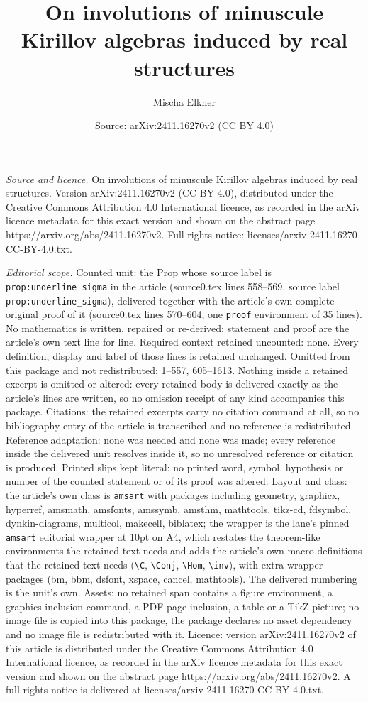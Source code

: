 \documentclass[10pt,a4paper]{amsart}
\title[On involutions of minuscule Kirillov algebras induced by rea]{On involutions of minuscule Kirillov algebras induced by real structures}
\author{Mischa Elkner}
\date{Source: arXiv:2411.16270v2 (CC BY 4.0)}
\begin{document}
\maketitle

\noindent\emph{Source and licence.} On involutions of minuscule Kirillov algebras induced by real structures. Version arXiv:2411.16270v2 (CC BY 4.0), distributed under the Creative Commons Attribution 4.0 International licence, as recorded in the arXiv licence metadata for this exact version and shown on the abstract page https://arxiv.org/abs/2411.16270v2. Full rights notice: licenses/arxiv-2411.16270-CC-BY-4.0.txt.\par\smallskip

\noindent\textit{Editorial scope.} Counted unit: the Prop whose source label is \texttt{prop:underline\_sigma} in the article (source0.tex lines 558--569, source label \texttt{prop:underline\_sigma}), delivered together with the article's own complete original proof of it (source0.tex lines 570--604, one \texttt{proof} environment of 35 lines). No mathematics is written, repaired or re-derived: statement and proof are the article's own text line for line. Required context retained uncounted: none. Every definition, display and label of those lines is retained unchanged. Omitted from this package and not redistributed: 1--557, 605--1613. Nothing inside a retained excerpt is omitted or altered: every retained body is delivered exactly as the article's lines are written, so no omission receipt of any kind accompanies this package. Citations: the retained excerpts carry no citation command at all, so no bibliography entry of the article is transcribed and no reference is redistributed. Reference adaptation: none was needed and none was made; every reference inside the delivered unit resolves inside it, so no unresolved reference or citation is produced. Printed slips kept literal: no printed word, symbol, hypothesis or number of the counted statement or of its proof was altered. Layout and class: the article's own class is \texttt{amsart} with packages including geometry, graphicx, hyperref, amsmath, amsfonts, amssymb, amsthm, mathtools, tikz-cd, fdsymbol, dynkin-diagrams, multicol, makecell, biblatex; the wrapper is the lane's pinned \texttt{amsart} editorial wrapper at 10pt on A4, which restates the theorem-like environments the retained text needs and adds the article's own macro definitions that the retained text needs (\texttt{\textbackslash C}, \texttt{\textbackslash Conj}, \texttt{\textbackslash Hom}, \texttt{\textbackslash inv}), with extra wrapper packages (bm, bbm, dsfont, xspace, cancel, mathtools). The delivered numbering is the unit's own. Assets: no retained span contains a figure environment, a graphics-inclusion command, a PDF-page inclusion, a table or a TikZ picture; no image file is copied into this package, the package declares no asset dependency and no image file is redistributed with it. Licence: version arXiv:2411.16270v2 of this article is distributed under the Creative Commons Attribution 4.0 International licence, as recorded in the arXiv licence metadata for this exact version and shown on the abstract page https://arxiv.org/abs/2411.16270v2. A full rights notice is delivered at licenses/arxiv-2411.16270-CC-BY-4.0.txt. 
\end{document}
